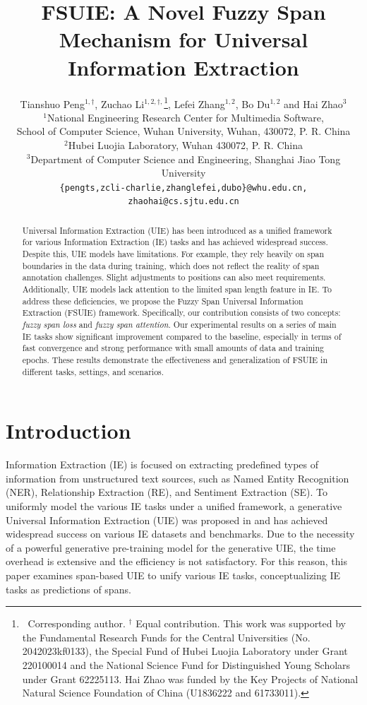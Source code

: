 \documentclass[11pt]{article}
\title{FSUIE: A Novel Fuzzy Span Mechanism for Universal Information Extraction}
\author{Tianshuo Peng$^{1,\dag}$, Zuchao Li$^{1,2,\dag,}$\thanks{$\ $  Corresponding author. $^\dag$ Equal contribution. This work was supported by the Fundamental Research Funds for the Central Universities (No. 2042023kf0133), the Special Fund of Hubei Luojia Laboratory under Grant 220100014 and the National Science Fund for Distinguished Young Scholars under Grant 62225113. Hai Zhao was funded by the Key Projects of National Natural Science Foundation of China (U1836222 and 61733011).}, Lefei Zhang$^{1,2}$, Bo Du$^{1,2}$ and Hai Zhao$^{3}$\\
$^{1}$National Engineering Research Center for Multimedia Software, \\
School of Computer Science, Wuhan University, Wuhan, 430072, P. R. China \\
$^{2}$Hubei Luojia Laboratory, Wuhan 430072, P. R. China \\
$^{3}$Department of Computer Science and Engineering, Shanghai Jiao Tong University\\
{\tt \{pengts,zcli-charlie,zhanglefei,dubo\}@whu.edu.cn,}\\
{\tt zhaohai@cs.sjtu.edu.cn}\\
}
\begin{document}
\maketitle

\begin{abstract}


Universal Information Extraction (UIE) has been introduced as a unified framework for various Information Extraction (IE) tasks and has achieved widespread success. Despite this, UIE models have limitations. For example, they rely heavily on span boundaries in the data during training, which does not reflect the reality of span annotation challenges. Slight adjustments to positions can also meet requirements. Additionally, UIE models lack attention to the limited span length feature in IE. To address these deficiencies, we propose the Fuzzy Span Universal Information Extraction (FSUIE) framework. Specifically, our contribution consists of two concepts: \textit{fuzzy span loss} and \textit{fuzzy span attention}. Our experimental results on a series of main IE tasks show significant improvement compared to the baseline, especially in terms of fast convergence and strong performance with small amounts of data and training epochs. These results demonstrate the effectiveness and generalization of FSUIE in different tasks, settings, and scenarios.

\end{abstract}

\section{Introduction}



Information Extraction (IE) is focused on extracting predefined types of information from unstructured text sources, such as Named Entity Recognition (NER), Relationship Extraction (RE), and Sentiment Extraction (SE). To uniformly model the various IE tasks under a unified framework, a generative Universal Information Extraction (UIE) was proposed in \cite{lu-etal-2022-unified} and has achieved widespread success on various IE datasets and  benchmarks. Due to the necessity of a powerful generative pre-training model for the generative UIE, the time overhead is extensive and the efficiency is not satisfactory. For this reason, this paper examines span-based UIE to unify various IE tasks, conceptualizing IE tasks as predictions of spans.
\end{document}
